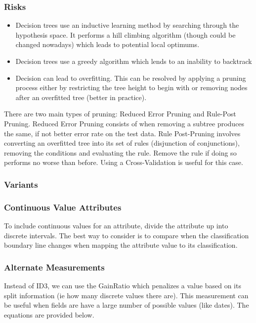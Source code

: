 \documentclass[11pt]{article}
\begin{document}
\subsubsection{Risks}

\begin{itemize}
\item Decision trees use an inductive learning method by searching through the hypothesis space. It performs a hill climbing algorithm (though could be changed nowadays) which leads to potential local optimums.
\item Decision trees use a greedy algorithm which lends to an inability to backtrack
\item Decision can lead to overfitting. This can be resolved by applying a pruning process either by restricting the tree height to begin with or removing nodes after an overfitted tree (better in practice).
\end{itemize}

There are two main types of pruning: Reduced Error Pruning and Rule-Post Pruning. Reduced Error Pruning consists of when removing a subtree produces the same, if not better error rate on the test data. Rule Post-Pruning involves converting an overfitted tree into its set of rules (disjunction of conjunctions), removing the conditions and evaluating the rule. Remove the rule if doing so performs no worse than before. Using a Cross-Validation is useful for this case.

\subsubsection{Variants}

\subsubsection*{Continuous Value Attributes}

To include continuous values for an attribute, divide the attribute up into discrete intervals. The best way to consider is to compare when the classification boundary line changes when mapping the attribute value to its classification.

\subsubsection*{Alternate Measurements}

Instead of ID3, we can use the GainRatio which penalizes a value based on its split information (ie how many discrete values there are). This measurement can be useful when fields are have a large number of possible values (like dates). The equations are provided below.
\end{document}
